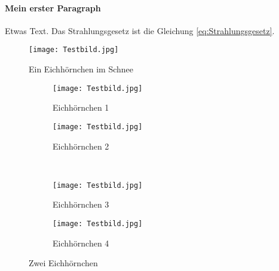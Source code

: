 \documentclass{article}
\begin{document}
\paragraph{Mein erster Paragraph} Etwas Text. Das Strahlungsgesetz ist die Gleichung \eqref{eq:Strahlungsgesetz}.
\begin{figure}
	\centering
	\texttt{[image: Testbild.jpg]}
	\caption{Ein Eichhörnchen im Schnee}
	\label{fig:eichhoernchen}
\end{figure}
\begin{figure}
	\begin{subfigure}{0.5\textwidth}
		\centering
		\texttt{[image: Testbild.jpg]}
		\caption{Eichhörnchen 1}
	\end{subfigure}
	\begin{subfigure}{0.5\textwidth}
		\centering
		\texttt{[image: Testbild.jpg]}
		\caption{Eichhörnchen 2}
		\label{subfig:zweitesEichhoernchen}
	\end{subfigure}\\
	\begin{subfigure}{0.5\textwidth}
		\centering
		\texttt{[image: Testbild.jpg]}
		\caption{Eichhörnchen 3}
	\end{subfigure}
	\begin{subfigure}{0.5\textwidth}
		\centering
		\texttt{[image: Testbild.jpg]}
		\caption{Eichhörnchen 4}
		\label{subfig:viertesEichhoernchen}
	\end{subfigure}
	\caption{Zwei Eichhörnchen}
\end{figure}
\end{document}
